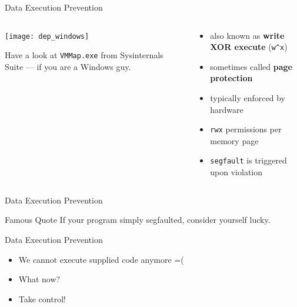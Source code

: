 \documentclass[beamer]{uibk}
\begin{document}
\begin{frame}{Data Execution Prevention}
    \begin{columns}
        \begin{column}{0.5\textwidth}
            \begin{center}
                \texttt{[image: dep\_windows]}
            \end{center}
            \medskip

            Have a look at \texttt{VMMap.exe} from Sysinternals Suite --- if
            you are a Windows guy.
        \end{column}
        \begin{column}{0.5\textwidth}
            \begin{itemize}
                \item also known as \textbf{write XOR execute} (\texttt{w\^{}x})
                \medskip
                \item sometimes called \textbf{page protection}
                \bigskip
                \item typically enforced by hardware
                \medskip
                \item \texttt{rwx} permissions per memory page
                \medskip
                \item \texttt{segfault} is triggered upon violation
            \end{itemize}
        \end{column}
    \end{columns}
\end{frame}

\begin{frame}{Data Execution Prevention}
    \begin{block}{Famous Quote}
        If your program simply segfaulted, consider yourself lucky.
    \end{block}
\end{frame}

\begin{frame}{Data Execution Prevention}
    \begin{itemize}
        \item We cannot execute supplied code anymore =(
        \item What now?
        \bigskip
        \pause
        \item Take control!
    \end{itemize}
\end{frame}
\end{document}
